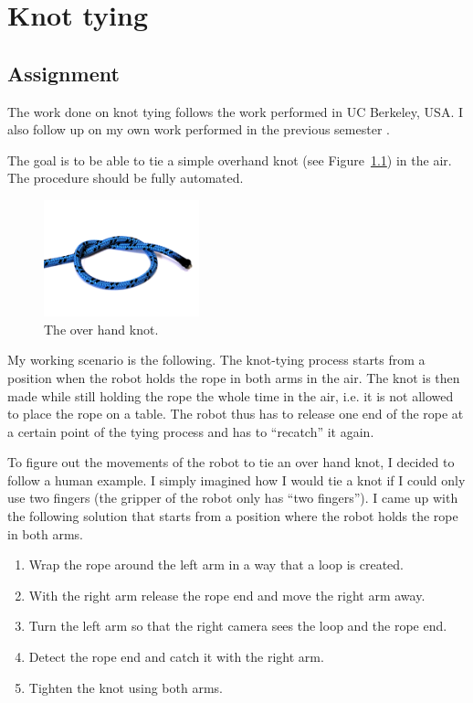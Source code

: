 \graphicspath{{Img/tyer/}}

\chapter{Knot tying}

    \section{Assignment} \label{sec:TheoreticalSolution}
        The work done on knot tying follows the work performed in UC Berkeley, USA. I also follow up on my own work performed in the previous semester \cite{PreDiplomaLejsekHlavac}.

        The goal is to be able to tie a simple overhand knot (see Figure~\ref{fig: over hand knot}) in the air. The procedure should be fully automated.

        \begin{figure}[h]
        \includegraphics[width=0.4\textwidth]{over_hand_knotAdj.png}
        \centering
        \caption{The over hand knot.}
        \label{fig: over hand knot}
        \end{figure}

        My working scenario is the following. The knot-tying process starts from a position when the robot holds the rope in both arms in the air. The knot is then made while still holding the rope the whole time in the air, i.e. it is not allowed to place the rope on a table. The robot thus has to release one end of the rope at a certain point of the tying process and has to ``recatch'' it again.

        To figure out the movements of the robot to tie an over hand knot, I decided to follow a human example. I simply imagined how I would tie a knot if I could only use two fingers (the gripper of the robot only has ``two fingers''). I came up with the following solution that starts from a position where the robot holds the rope in both arms.
%
        \begin{enumerate}\itemsep0pt
        \label{enu:TheoreticalSolution}
            \item Wrap the rope around the left arm in a way that a loop is created.
            \item With the right arm release the rope end and move the right arm away.
            \item Turn the left arm so that the right camera sees the loop and the rope end.
            \item Detect the rope end and catch it with the right arm.
            \item Tighten the knot using both arms.
        \end{enumerate}


